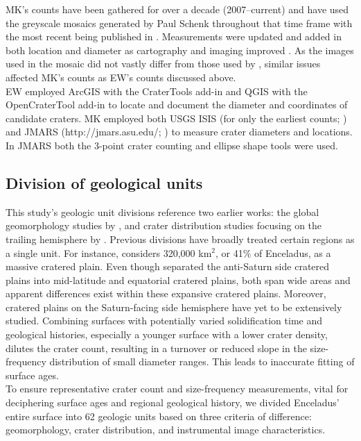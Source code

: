 \documentclass[preprint,12pt,3p,times,authoryear]{elsarticle}
\begin{document}
MK's counts have been gathered for over a decade (2007–current) and have used the greyscale mosaics generated by Paul Schenk throughout that time frame \citep{Schenk2011,Schenk2018} with the most recent being published in \citet{Schenk2024}. Measurements were updated and added in both location and diameter as cartography and imaging improved \citet{Kirchoff2016,Kirchoff2018}. As the images used in the mosaic did not vastly differ from those used by \citet{Bland2018}, similar issues affected MK's counts as EW's counts discussed above.\\

EW employed ArcGIS with the CraterTools add-in \citep{Kneissl2011} and QGIS with the OpenCraterTool add-in \citep{Heyer2023} to locate and document the diameter and coordinates of candidate craters. MK employed both USGS ISIS (for only the earliest counts; \citealt{Kirchoff2009}) and JMARS (http://jmars.asu.edu/; \citealt{Christensen2009}) to measure crater diameters and locations.  In JMARS both the 3-point crater counting and ellipse shape tools were used.

\subsection{Division of geological units}
\label{app:gu}
This study’s geologic unit divisions reference two earlier works: the global geomorphology studies by \citet{CrowWillard2015}, and crater distribution studies focusing on the trailing hemisphere by \citet{Kirchoff2009}. Previous divisions have broadly treated certain regions as a single unit. For instance, \citet{CrowWillard2015} considers 320,000 km$^{2}$, or 41\% of Enceladus, as a massive cratered plain. Even though \citet{Kirchoff2009} separated the anti-Saturn side cratered plains into mid-latitude and equatorial cratered plains, both span wide areas and apparent differences exist within these expansive cratered plains. Moreover, cratered plains on the Saturn-facing side hemisphere have yet to be extensively studied. Combining surfaces with potentially varied solidification time and geological histories, especially a younger surface with a lower crater density, dilutes the crater count, resulting in a turnover or reduced slope in the size-frequency distribution of small diameter ranges. This leads to inaccurate fitting of surface ages. \\

To ensure representative crater count and size-frequency measurements, vital for deciphering surface ages and regional geological history, we divided Enceladus’ entire surface into 62 geologic units based on three criteria of difference: geomorphology, crater distribution, and instrumental image characteristics.
\end{document}
